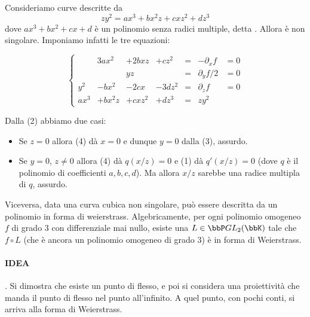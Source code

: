Consideriamo curve descritte da
$$ zy^2= ax^3+bx^2z+cxz^2+dz^3 $$
 dove $ax^3+bx^2+cx+d$ è un polinomio senza radici multiple, detta . Allora è non singolare. Imponiamo infatti le tre equazioni:


$$ \left\{ 
\begin{matrix}
&3ax^2&+2bxz&+cz^2 & = & -\partial_{x}f & = 0 \\
&&yz& & = & \partial_{y}f / 2 &= 0 \\
y^2 &-bx^2&-2cx&-3dz^2 & = & \partial_{z}f& = 0 \\
ax^3&+bx^2z&+cxz^2&+dz^3& = & zy^2&
\end{matrix}
\right.$$

Dalla (2) abbiamo due casi:

\begin{itemize}
	\item Se $z=0$ allora (4) dà $x=0$ e dunque $y=0$ dalla (3), assurdo.

	\item Se $y = 0$, $z \neq 0$ allora (4) dà $q(x/z) = 0$ e (1) dà $q'(x/z) = 0$ (dove $q$ è il polinomio di coefficienti $a,b,c,d$). Ma allora $x/z$ sarebbe una radice multipla di $q$, assurdo.  
\end{itemize}

Viceversa, data una curva cubica non singolare, può essere descritta da un polinomio in forma di weierstrass. Algebricamente, per ogni polinomio omogeneo $f$ di grado 3 con differenziale mai nullo, esiste una $L \in \bbP GL_2(\bbK) $ tale che $f \circ L$ (che è ancora un polinomio omogeneo di grado 3) è in forma di Weierstrass. 
\paragraph{IDEA}. Si dimostra che esiste un punto di flesso, e poi si considera una proiettività che manda il punto di flesso nel punto all'infinito. A quel punto, con pochi conti, si arriva alla forma di Weierstrass.

